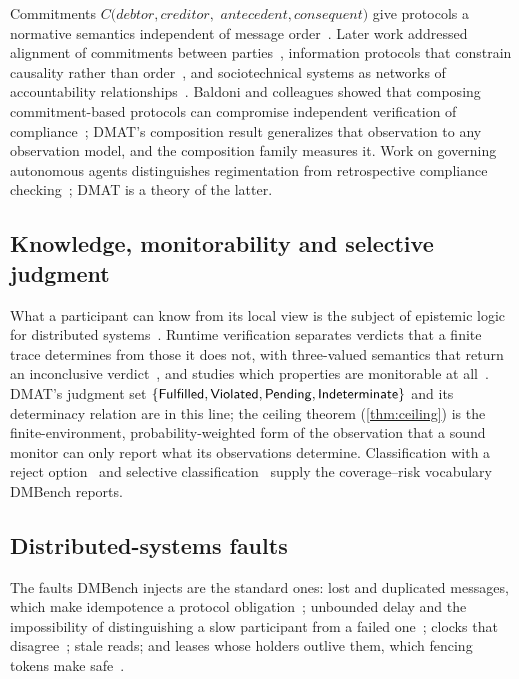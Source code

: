 Commitments $C(\mathit{debtor},\mathit{creditor},$ $\mathit{antecedent},\mathit{consequent})$ give protocols a normative semantics independent of message order~\cite{singh1999ontology,yolum2002flexible,fornara2002operational}. Later work addressed alignment of commitments between parties~\cite{chopra2009alignment}, information protocols that constrain causality rather than order~\cite{singh2011bspl}, and sociotechnical systems as networks of accountability relationships~\cite{chopra2016social,chopra2014accountability}. Baldoni and colleagues showed that composing commitment-based protocols can compromise independent verification of compliance~\cite{baldoni2015composing}; DMAT's composition result generalizes that observation to any observation model, and the composition family measures it. Work on governing autonomous agents distinguishes regimentation from retrospective compliance checking~\cite{kampik2022governance}; DMAT is a theory of the latter.

\subsection{Knowledge, monitorability and selective judgment}

What a participant can know from its local view is the subject of epistemic logic for distributed systems~\cite{halpern1990knowledge,fagin1995reasoning}. Runtime verification separates verdicts that a finite trace determines from those it does not, with three-valued semantics that return an inconclusive verdict~\cite{bauer2011runtime,leucker2009brief}, and studies which properties are monitorable at all~\cite{francalanza2017monitorability}. DMAT's judgment set $\{\mathsf{Fulfilled},\mathsf{Violated},\mathsf{Pending},\mathsf{Indeterminate}\}$ and its determinacy relation are in this line; the ceiling theorem (\cref{thm:ceiling}) is the finite-environment, probability-weighted form of the observation that a sound monitor can only report what its observations determine. Classification with a reject option~\cite{chow1970optimum} and selective classification~\cite{elyaniv2010foundations} supply the coverage--risk vocabulary DMBench reports.

\subsection{Distributed-systems faults}

The faults DMBench injects are the standard ones: lost and duplicated messages, which make idempotence a protocol obligation~\cite{helland2012idempotence}; unbounded delay and the impossibility of distinguishing a slow participant from a failed one~\cite{fischer1985impossibility,chandra1996unreliable}; clocks that disagree~\cite{lamport1978time}; stale reads; and leases whose holders outlive them, which fencing tokens make safe~\cite{gray1989leases,kleppmann2017designing}.

